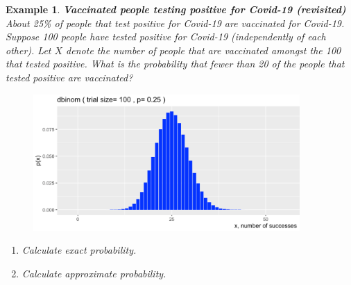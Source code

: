 \documentclass[12pt]{amsart}
\newtheorem{example}[theorem]{Example}
\newcommand{\m}{\mu}
\newcommand{\s}{\sigma}
\newcommand{\bP}{\mathbb{P}}
\begin{document}
{\newpage
\begin{example}\label{VaccBinom10}  \textbf{Vaccinated people testing positive for Covid-19 (revisited)} \newline
About 25\% of people that test positive for Covid-19 are vaccinated for Covid-19.\newline
Suppose 100 people have tested positive for Covid-19 (independently of each other). \newline
Let $X$ denote the number of people that are vaccinated amongst the 100 that tested positive.\newline
What is the probability that fewer than 20 of the people that tested positive are vaccinated?
\begin{figure}[h!]
  \includegraphics[width=4in]{img/binom_n100_p25_crop.png}
\end{figure}



\begin{enumerate}
\item Calculate exact probability.
%


\vspace{4cm}

\item Calculate approximate probability.

%


\end{enumerate}
\end{example}}
\end{document}
